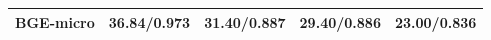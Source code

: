 \begin{tabular}{lllll}
\toprule
BGE-micro & 36.84/0.973 & 31.40/0.887 & 29.40/0.886 & 23.00/0.836 \\
\midrule
\bottomrule
\end{tabular}
